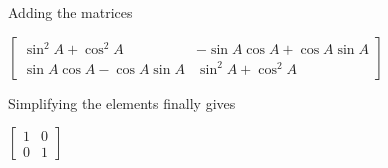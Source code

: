 \documentclass[journal,12pt,twocolumn]{IEEEtran}
\begin{document}
Adding the matrices

\begin{center}
$\left [\begin{array}{cc}\sin^2 A + \cos^2 A &  -\sin A \cos A +\cos A \sin A \\
 \sin A \cos A -\cos A \sin A & \sin^2 A + \cos^2 A\end{array}\right ]$\linebreak
\end{center}\par

Simplifying the elements finally gives

\begin{center}
$\left [\begin{array}{cc}1 & 0 \\
0 & 1\end{array}\right ]$
\end{center}\par
\end{document}
